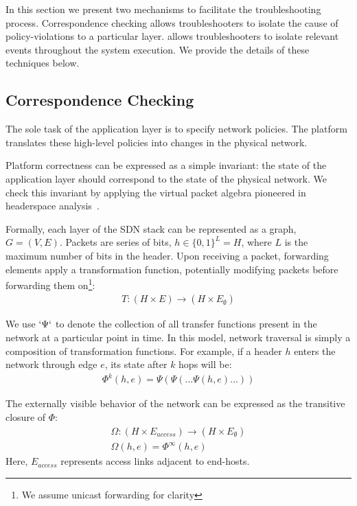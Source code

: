 In this section we present two mechanisms to facilitate the troubleshooting
process. Correspondence checking allows troubleshooters to isolate
the cause of policy-violations to a particular layer. \Simulator{}
allows troubleshooters to isolate relevant events throughout the system
execution. We provide the details of these techniques below. 

\subsection{Correspondence Checking}

The sole task of the application layer is to specify network
policies. The platform translates these high-level policies
into changes in the physical network.

Platform correctness can be expressed as a simple invariant:
the state of the application layer should correspond to the state of the
physical network. We check this invariant by applying the virtual packet
algebra pioneered in headerspace analysis~\cite{hsa}. 

Formally, each layer of the SDN stack can be represented as a graph,
$G = (V, E)$. Packets are series of bits, $h \in \{0,1\}^L = H$,
where $L$ is the maximum number of bits in the header. Upon receiving a packet,
forwarding elements apply a transformation function, potentially modifying
packets before forwarding them on\footnote{We assume unicast forwarding for
clarity}:
\begin{align*}
T: (H \times E) \rightarrow (H \times E_{\emptyset})
\end{align*}

We use $`\Psi`$ to denote the collection of all transfer functions present in
the network at a particular point in time. In this model, network traversal is simply a composition of transformation
functions. For example, if a header $h$ enters the network through edge
$e$, its state after $k$ hops will be:
\begin{align*}
\Phi^k(h,e) = \Psi(\Psi(\dots \Psi(h,e)\dots))
\end{align*}

The externally visible behavior of the network can be expressed as the
transitive closure of $\Phi$:
\begin{align*}
\Omega: (H \times E_{access}) \rightarrow (H \times E_{\emptyset}) \\
\Omega(h,e) = \Phi^{\infty}(h,e)
\end{align*}
Here, $E_{access}$ represents access links adjacent to end-hosts.

